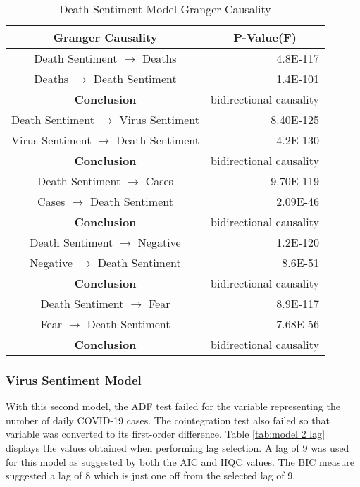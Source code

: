 \begin{table}[H]
\centering
\begin{tabular}{@{}cr@{}}
\toprule
\textbf{Granger Causality} & \multicolumn{1}{c}{\textbf{P-Value(F)}} \\ \midrule
Death Sentiment $\rightarrow$ Deaths & 4.8E-117 \\
Deaths $\rightarrow$ Death Sentiment & 1.4E-101 \\
\textbf{Conclusion} & \multicolumn{1}{c}{bidirectional causality} \\
Death Sentiment $\rightarrow$ Virus Sentiment & 8.40E-125 \\
Virus Sentiment $\rightarrow$ Death Sentiment & 4.2E-130 \\
\textbf{Conclusion} & \multicolumn{1}{c}{bidirectional causality} \\
Death Sentiment $\rightarrow$ Cases & 9.70E-119 \\
Cases $\rightarrow$ Death Sentiment & 2.09E-46 \\
\textbf{Conclusion} & \multicolumn{1}{c}{bidirectional causality} \\
Death Sentiment $\rightarrow$ Negative & 1.2E-120 \\
Negative $\rightarrow$ Death Sentiment & 8.6E-51 \\
\textbf{Conclusion} & \multicolumn{1}{c}{bidirectional causality} \\
Death Sentiment $\rightarrow$ Fear & 8.9E-117 \\
Fear $\rightarrow$ Death Sentiment & 7.68E-56 \\
\textbf{Conclusion} & \multicolumn{1}{c}{bidirectional causality} \\ \bottomrule
\end{tabular}
\caption{Death Sentiment Model Granger Causality}
\label{tab:model 1 causality}
\end{table}

\subsubsection{Virus Sentiment Model}

With this second model, the ADF test failed for the variable representing the number of daily COVID-19 cases. The cointegration test also failed so that variable was converted to its first-order difference. Table \ref{tab:model 2 lag} displays the values obtained when performing lag selection. A lag of 9 was used for this model as suggested by both the AIC and HQC values. The BIC measure suggested a lag of 8 which is just one off from the selected lag of 9.

